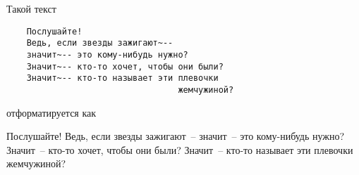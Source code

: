 \documentclass[../../main.tex]{subfiles}
\begin{document}
\begin{exmp}[Маяковский]

    Такой текст

\begin{verbatim}
    Послушайте!
    Ведь, если звезды зажигают~--
    значит~-- это кому-нибудь нужно?
    Значит~-- кто-то хочет, чтобы они были?
    Значит~-- кто-то называет эти плевочки
                                  жемчужиной?
\end{verbatim}

    отформатируется как

    \medskip

    Послушайте!
    Ведь, если звезды зажигают~--
    значит~-- это кому-нибудь нужно?
    Значит~-- кто-то хочет, чтобы они были?
    Значит~-- кто-то называет эти плевочки
                                  жемчужиной?

\end{exmp}
\end{document}
